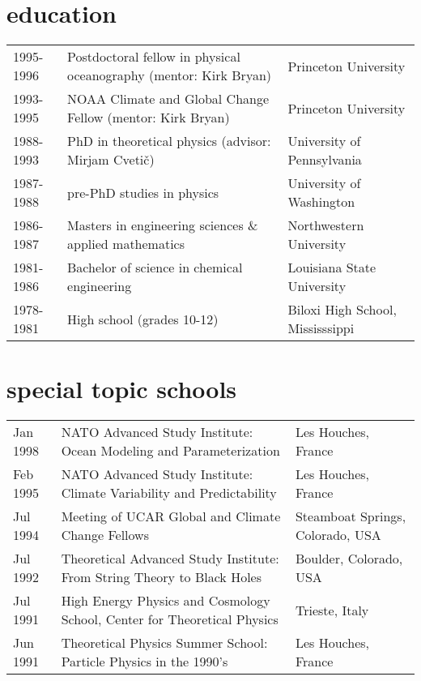 \documentclass{article}
\begin{document}
\section*{\sc \color{Maroon} education}
\vspace{-.25cm}
\begin{tabular}{lll}
1995-1996  &  Postdoctoral fellow in physical oceanography (mentor: Kirk Bryan) & Princeton University 
\\
1993-1995  &  NOAA Climate and Global Change Fellow (mentor: Kirk Bryan) & Princeton University 
\\
1988-1993  &  PhD in theoretical physics 
(advisor: Mirjam Cveti\v{c}) 
& University of Pennsylvania 
\\
1987-1988  &  pre-PhD studies in physics & University of Washington
\\
1986-1987  &  Masters in engineering sciences \& applied mathematics   & Northwestern University\\
1981-1986  &  Bachelor of science in chemical engineering  & Louisiana State University \\
1978-1981  & High school (grades 10-12) & Biloxi High School, Mississsippi
 \end{tabular}


\vspace{-.2cm}
\section*{\sc \color{Maroon} special topic schools}
\vspace{-.25cm}
\begin{tabular}{lll}
Jan 1998  &  NATO Advanced Study Institute: {\sc Ocean Modeling and Parameterization} & Les Houches, France 
\\
Feb 1995 & NATO Advanced Study Institute: {\sc Climate Variability and Predictability} & Les Houches, France
\\
Jul 1994 & Meeting of UCAR Global and Climate Change Fellows & Steamboat Springs, Colorado, USA
\\
Jul 1992 & Theoretical Advanced Study Institute: {\sc From String Theory to Black Holes} & Boulder, Colorado, USA
\\
Jul 1991 & High Energy Physics and Cosmology School, Center for Theoretical Physics & Trieste, Italy
\\
Jun 1991 & Theoretical Physics Summer School: {\sc Particle Physics in the 1990's} & Les Houches, France
 \end{tabular}
\end{document}
